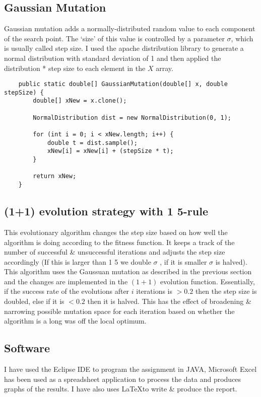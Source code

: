 \documentclass{article}
\begin{document}
   	\subsection{Gaussian Mutation}
   	Gaussian mutation adds a normally-distributed random value to each component of the search point. The ‘size’ of this value is controlled by a parameter $\sigma$, which is usually called step size. I used the apache distribution library to generate a normal distribution with standard deviation of 1 and then applied the distribution * step size to each element in the $X$ array.
   	\begin{lstlisting}
   	public static double[] GaussianMutation(double[] x, double stepSize) {
		double[] xNew = x.clone();

		NormalDistribution dist = new NormalDistribution(0, 1);

		for (int i = 0; i < xNew.length; i++) {
			double t = dist.sample();
			xNew[i] = xNew[i] + (stepSize * t);
		}

		return xNew;
	}
   	\end{lstlisting}
   	
   	\subsection{ (1+1) evolution strategy with 1 5-rule}
   	This evolutionary algorithm changes the step size based on how well the algorithm is doing according to the fitness function. It keeps a track of the number of successful \& unsuccessful iterations and adjusts the step size accordingly (If this is larger than 1  5  we double $\sigma$ , if it is smaller $\sigma$ is halved).\\

   	This algorithm uses the Gaussuan mutation as described in the previous section and the changes are implemented in the $(1+1)$ evolution function. Essentially, if the success rate of the evolutions after $i$ iterations is $> 0.2$ then the step size is doubled, else if it is $< 0.2$ then it is halved. This has the effect of broadening \& narrowing possible mutation space for each iteration based on whether the algorithm is a long was off the local optimum.

	\subsection{Software}
	I have used the Eclipse IDE to program the assignment in JAVA, Microsoft Excel has been used as a spreadsheet application to process the data and produces graphs of the results. I have also uses \LaTeX to write \& produce the report.
\end{document}
